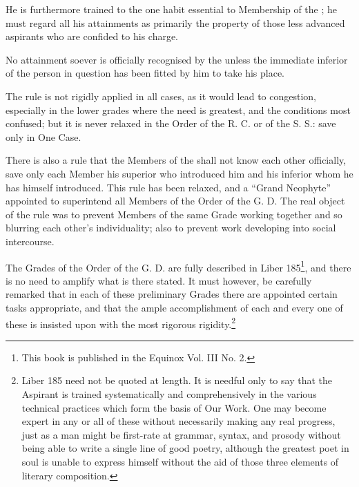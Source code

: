 He is furthermore trained to the one habit essential to Membership of the \Argentium{}; he must regard all his attainments as primarily the property of those less advanced aspirants who are confided to his charge.

No attainment soever is officially recognised by the \Argentium{} unless the immediate inferior of the person in question has been fitted by him to take his place.

The rule is not rigidly applied in all cases, as it would lead to congestion, especially in the lower grades where the need is greatest, and the conditions most confused; but it is never relaxed in the Order of the R. C. or of the S. S.: save only in One Case.

There is also a rule that the Members of the \Argentium{} shall not know each other officially, save only each Member his superior who introduced him and his inferior whom he has himself introduced. This rule has been relaxed, and a \enquote{Grand Neophyte} appointed to superintend all Members of the Order of the G. D. The real object of the rule was to prevent Members of the same Grade working together and so blurring each other's individuality; also to prevent work developing into social intercourse.

The Grades of the Order of the G. D. are fully described in Liber 185\footnote{This book is published in the Equinox Vol. III No. 2.\footnotemark}, and there is no need to amplify what is there stated. It must however, be carefully remarked that in each of these preliminary Grades there are appointed certain tasks appropriate, and that the ample accomplishment of each and every one of these is insisted upon with the most rigorous rigidity.\footnote{Liber 185 need not be quoted at length. It is needful only to say that the Aspirant is trained systematically and comprehensively in the various technical practices which form the basis of Our Work. One may become expert in any or all of these without necessarily making any real progress, just as a man might be first-rate at grammar, syntax, and prosody without being able to write a single line of good poetry, although the greatest poet in soul is unable to express himself without the aid of those three elements of literary composition.}

